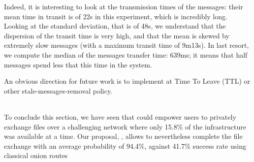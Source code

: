 Indeed, it is interesting to look at the transmission times of the messages: their mean time in transit is of 22s in this experiment, which is incredibly long.
Looking at the standard deviation, that is of 48s, we understand that the dispersion of the transit time is very high, and that the mean is skewed by 
extremely slow messages (with a maximum transit time of 9m13s).
In last resort, we compute the median of the messages transfer time: 639ms; it means that half messages spend less that this time in the system.

An obvious direction for future work is to implement at Time To Leave (TTL) or other stale-messages-removal policy.

\\
To conclude this section, we have seen that \name could empower users to privately exchange files over a challenging network where only 15.8\% of the infrastructure was available at a time.
Our proposal, \name, allows to nevertheless complete the file exchange with an average probability of 94.4\%, against 41.7\% success rate using classical onion routes











